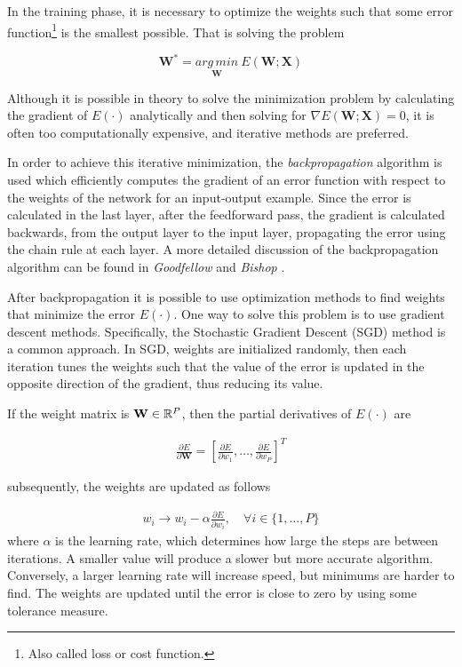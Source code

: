 In the training phase, it is necessary to optimize the weights such that some error function\footnote{Also called loss or cost function.} is the smallest possible. That is solving the problem 

\begin{equation*}
    \mathbf{W}^*=\underset{\mathbf{W}}{arg\,min}\:E(\mathbf{W};\mathbf{X})
\end{equation*}

Although it is possible in theory to solve the minimization problem by calculating the gradient of $E(\cdot)$ analytically and then solving for $\nabla E(\mathbf{W};\mathbf{X})=0$, it is often too computationally expensive, and iterative methods are preferred. 

In order to achieve this iterative minimization, the \textit{backpropagation} algorithm is used which efficiently computes the gradient of an error function with respect to the weights of the network for an input-output example. Since the error is calculated in the last layer, after the feedforward pass, the gradient is calculated backwards, from the output layer to the input layer, propagating the error using the chain rule at each layer. A more detailed discussion of the backpropagation algorithm can be found in \textit{Goodfellow} and \textit{Bishop} \cite{dl-book, bishop}.

After backpropagation it is possible to use optimization methods to find weights that minimize the error $E(\cdot)$. One way to solve this problem is to use gradient descent methods. Specifically, the Stochastic Gradient Descent (SGD) method is a common approach. In SGD, weights are initialized randomly, then each iteration tunes the weights such that the value of the error is updated in the opposite direction of the gradient, thus reducing its value.

If the weight matrix is $\mathbf{W} \in \mathbb{R}^P$, then the partial derivatives of $E(\cdot)$ are

\begin{align*}
    \frac{\partial E}{\partial \mathbf{W}}=\left[\frac{\partial E}{\partial w_1}, \ldots, \frac{\partial E}{\partial w_P}\right]^T
\end{align*}
 
subsequently, the weights are updated as follows

\begin{align}
    w_i \xrightarrow{} w_i - \alpha \frac{\partial E}{\partial w_i},\quad \forall i \in \{1,\ldots, P\} 
    \label{eq:sgd}
\end{align}
where $\alpha$ is the learning rate, which determines how large the steps are between iterations. A smaller value will produce a slower but more accurate algorithm. Conversely, a larger learning rate will increase speed, but minimums are harder to find. The weights are updated until the error is close to zero by using some tolerance measure.


